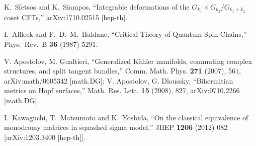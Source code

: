 \documentclass[12pt]{article}
\begin{document}
\begin{thebibliography}{99}
{ %
  K.~Sfetsos and K.~Siampos,
   ``Integrable deformations of the $G_{k_1} \times G_{k_2}/G_{k_1+k_2}$ coset CFTs,''
  arXiv:1710.02515 [hep-th].
  
  
  I.~Affleck and F.~D.~M.~Haldane,
  ``Critical Theory of Quantum Spin Chains,''
  Phys.\ Rev.\ B {\bf 36} (1987) 5291.
  
V. Apostolov, M. Gualtieri, ``Generalized K\"ahler manifolds, commuting complex structures, and split tangent bundles,'' Comm. Math. Phys.  {\bf 271} (2007), 561, arXiv:math/0605342 [math.DG]; 
V. Apostolov, G. Dloussky, 
``Bihermitian metrics on Hopf surfaces,'' 
Math. Res. Lett. {\bf 15}  (2008),  827,  arXiv:0710.2266 [math.DG].

  I.~Kawaguchi, T.~Matsumoto and K.~Yoshida,
  ``On the classical equivalence of monodromy matrices in squashed sigma model,''
  JHEP {\bf 1206} (2012) 082
  [arXiv:1203.3400 [hep-th]].



}\end{thebibliography}
  
  
\end{document}
